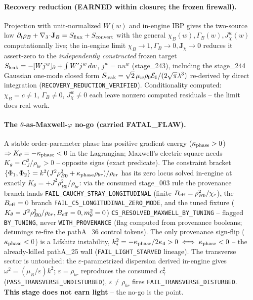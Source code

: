 \paragraph{Recovery reduction (EARNED within closure; the frozen firewall).}
Projection with unit-normalized \(W(w)\) and in-engine IBP gives the two-source
law \(\partial_t\rho_B+\nabla_3\!\cdot\!\mathbf J_B=S_{\rm flux}+S_{\rm convert}\)
with the general \(\chi_B(w),\Gamma_B(w),J_\chi^w(w)\) computationally live; the
in-engine limit \(\chi_B\to1,\Gamma_B\to0,\mathbf J_\chi\to0\) reduces it
assert-zero to the \emph{independently constructed} frozen target
\(S_{\rm leak}=-[Wj^w]_\partial+\int W'j^w\,dw\), \(j^w=nu^w\)
(stage\_243), including the stage\_244 Gaussian one-mode closed form
\(S_{\rm leak}=\sqrt2\,\mu_w\rho_0\mathcal E_0/(2\sqrt\pi\lambda^3)\) re-derived
by direct integration (\texttt{RECOVERY\_REDUCTION\_VERIFIED}). Conditionality
computed: \(\chi_B=c\neq1\), \(\Gamma_B\neq0\), \(J_\chi^w\neq0\) each leave
nonzero computed residuals -- the limit does real work.

\paragraph{The \(\theta\)-as-Maxwell-\(\varphi\) no-go (carried FATAL\_FLAW).}
A stable order-parameter phase has positive gradient energy
(\(\kappa_{\rm phase}>0\)) \(\Rightarrow K_\theta=-\kappa_{\rm phase}<0\) in the
Lagrangian; Maxwell's electric square needs \(K_\theta=C_J^2/\rho_{br}>0\) --
opposite signs (exact predicate). The constraint bracket
\(\{\Phi_1,\Phi_2\}=k^2(J^2\rho_{B0}^2+\kappa_{\rm phase}\rho_{br})/\rho_{br}\)
has its zero locus solved in-engine at exactly \(K_\theta=+J^2\rho_{B0}^2/\rho_{br}\):
via the consumed stage\_003 rule the provenance branch lands
\texttt{FAIL\_CAUCHY\_STRAY\_LONGITUDINAL} (finite
\(B_{\rm eff}=\rho_{B0}^2/\chi_c\)), the \(B_{\rm eff}=0\) branch
\texttt{FAIL\_C5\_LONGITUDINAL\_ZERO\_MODE}, and the tuned fixture
(\(K_\theta=J^2\rho_{B0}^2/\rho_{br},B_{\rm eff}=0,m_\theta^2=0\))
\texttt{C5\_RESOLVED\_MAXWELL\_BY\_TUNING} -- flagged \texttt{BY\_TUNING}, never
\texttt{WITH\_PROVENANCE} (flag computed from provenance booleans; detunings
re-fire the pathA\_36 control tokens). The only provenance sign-flip
(\(\kappa_{\rm phase}<0\)) is a Lifshitz instability,
\(k_*^2=-\kappa_{\rm phase}/2\kappa_4>0\iff\kappa_{\rm phase}<0\) -- the
already-killed pathA\_25 wall (\texttt{FAIL\_LIGHT\_STARVED} lineage). The
transverse sector is untouched: the \(\varepsilon\)-parametrized dispersion
derived in-engine gives \(\omega^2=(\mu_R/\varepsilon)k^2\);
\(\varepsilon=\rho_{br}\) reproduces the consumed \(c_\gamma^2\)
(\texttt{PASS\_TRANSVERSE\_UNDISTURBED}), \(\varepsilon\neq\rho_{br}\) fires
\texttt{FAIL\_TRANSVERSE\_DISTURBED}. \textbf{This stage does not earn light} --
the no-go is the point.

